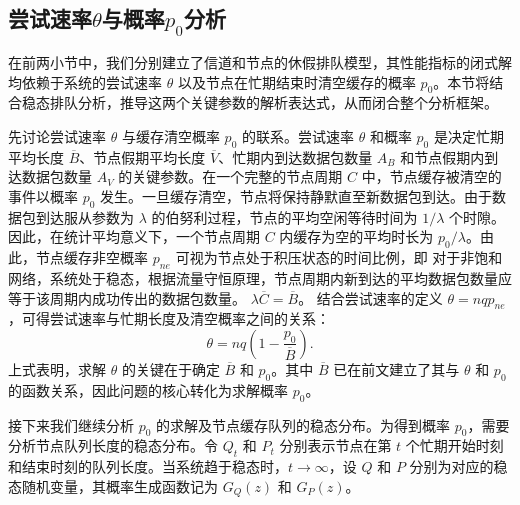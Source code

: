 \subsection{尝试速率$\theta$与概率$p_0$分析}
\label{subsec:attempt_rate_analysis}

在前两小节中，我们分别建立了信道和节点的休假排队模型，其性能指标的闭式解均依赖于系统的尝试速率 $\theta$ 以及节点在忙期结束时清空缓存的概率 $p_0$。本节将结合稳态排队分析，推导这两个关键参数的解析表达式，从而闭合整个分析框架。

先讨论尝试速率 $\theta$ 与缓存清空概率 $p_{0}$ 的联系。尝试速率 $\theta$ 和概率 $p_0$ 是决定忙期平均长度 $\overline{B}$、节点假期平均长度 $\overline{V}$、忙期内到达数据包数量 $A_B$ 和节点假期内到达数据包数量 $A_V$ 的关键参数。在一个完整的节点周期 $C$ 中，节点缓存被清空的事件以概率 $p_0$ 发生。一旦缓存清空，节点将保持静默直至新数据包到达。由于数据包到达服从参数为 $\lambda$ 的伯努利过程，节点的平均空闲等待时间为 $1/\lambda$ 个时隙。因此，在统计平均意义下，一个节点周期 $C$ 内缓存为空的平均时长为 $p_0 / \lambda$。由此，节点缓存非空概率 $p_{ne}$ 可视为节点处于积压状态的时间比例，即
对于非饱和网络，系统处于稳态，根据流量守恒原理，节点周期内新到达的平均数据包数量应等于该周期内成功传出的数据包数量。	$ \lambda \overline{C} = \overline{B} $。
结合尝试速率的定义 $\theta = n q p_{ne}$，可得尝试速率与忙期长度及清空概率之间的关系：
\begin{equation}
	\label{eq:theta_relation}
	\theta = n q \left( 1 - \frac{p_0}{\overline{B}} \right).
\end{equation}
上式表明，求解 $\theta$ 的关键在于确定 $\overline{B}$ 和 $p_0$。其中 $\overline{B}$ 已在前文建立了其与 $\theta$ 和 $p_0$ 的函数关系，因此问题的核心转化为求解概率 $p_0$。

接下来我们继续分析 $p_0$ 的求解及节点缓存队列的稳态分布。为得到概率 $p_0$，需要分析节点队列长度的稳态分布。令 $Q_t$ 和 $P_t$ 分别表示节点在第 $t$ 个忙期开始时刻和结束时刻的队列长度。当系统趋于稳态时，$t \to \infty$，设 $Q$ 和 $P$ 分别为对应的稳态随机变量，其概率生成函数记为 $G_Q(z)$ 和 $G_P(z)$。

